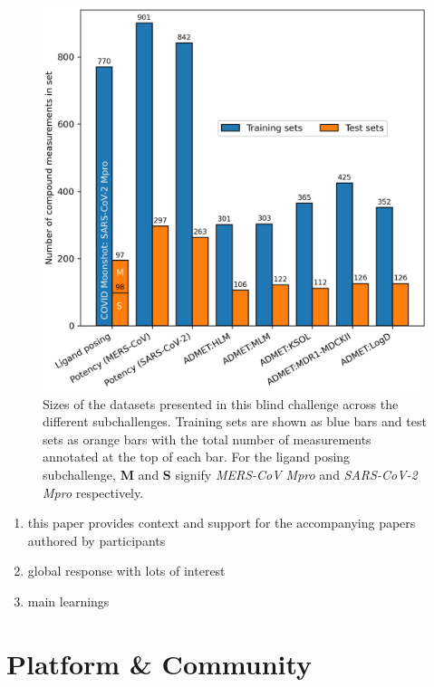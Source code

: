 \documentclass[journal=jacsat,manuscript=article]{achemso}
\begin{document}
\begin{figure}
    \includegraphics[scale=0.5]{01_figs_introduction/datasets_overview.png}
  \caption{Sizes of the datasets presented in this blind challenge across the different subchallenges. Training sets are shown as blue bars and test sets as orange bars with the total number of measurements annotated at the top of each bar. For the ligand posing subchallenge, \textbf{M} and \textbf{S} signify \textit{MERS-CoV Mpro} and \textit{SARS-CoV-2 Mpro} respectively. }
  \label{fgr:datasets_overview}
\end{figure}
\begin{enumerate}
    \item this paper provides context and support for the accompanying papers authored by participants
    \item global response with lots of interest
    \item main learnings  
\end{enumerate}

\section{Platform \& Community}
\end{document}

